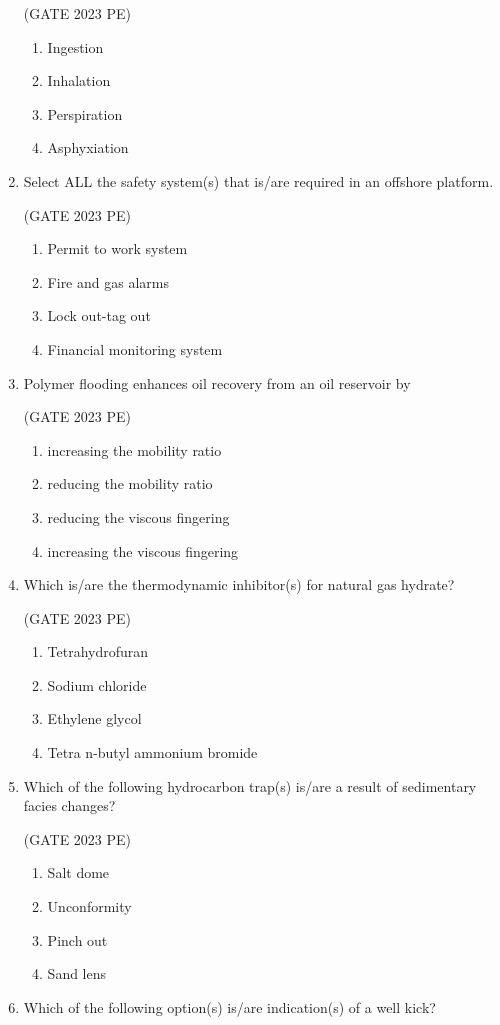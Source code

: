 \documentclass[journal,12pt,onecolumn]{exam}
\theoremstyle{remark}
\begin{document}
\begin{enumerate}
\hfill{(GATE 2023 PE)}\\
\begin{enumerate}
    \item Ingestion
    \item Inhalation
    \item Perspiration
    \item Asphyxiation
\end{enumerate}
\item Select ALL the safety system(s) that is/are required in an offshore platform.

\hfill{(GATE 2023 PE)}\\
\begin{enumerate}
    \item Permit to work system
    \item Fire and gas alarms
    \item Lock out-tag out
    \item Financial monitoring system
\end{enumerate}
\item Polymer flooding enhances oil recovery from an oil reservoir by

\hfill{(GATE 2023 PE)}\\
\begin{enumerate}
    \item increasing the mobility ratio
    \item reducing the mobility ratio
    \item reducing the viscous fingering
    \item increasing the viscous fingering
\end{enumerate}
\item Which is/are the thermodynamic inhibitor(s) for natural gas hydrate?

\hfill{(GATE 2023 PE)}\\
\begin{enumerate}
    \item Tetrahydrofuran
    \item Sodium chloride
    \item Ethylene glycol
    \item Tetra n-butyl ammonium bromide
\end{enumerate}
\item Which of the following hydrocarbon trap(s) is/are a result of sedimentary facies
changes?

\hfill{(GATE 2023 PE)}\\
\begin{enumerate}
    \item Salt dome
    \item Unconformity
    \item Pinch out
    \item Sand lens
\end{enumerate}
\item Which of the following option(s) is/are indication(s) of a well kick?


\end{enumerate}
\end{document}
